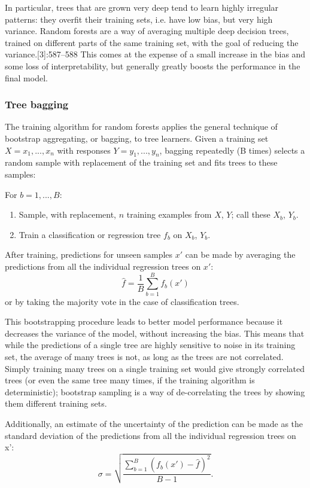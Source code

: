 \documentclass[document.tex]{subfiles}
\begin{document}
In particular, trees that are grown very deep tend to learn highly irregular patterns: they overfit their training sets, i.e. have low bias, but very high variance. Random forests are a way of averaging multiple deep decision trees, trained on different parts of the same training set, with the goal of reducing the variance.[3]:587–588 This comes at the expense of a small increase in the bias and some loss of interpretability, but generally greatly boosts the performance in the final model.

\subsubsection{Tree bagging}
The training algorithm for random forests applies the general technique of bootstrap aggregating, or bagging, to tree learners. Given a training set $X = x_1, ..., x_n$ with responses $Y = y_1, ..., y_n$, bagging repeatedly (B times) selects a random sample with replacement of the training set and fits trees to these samples:

For $b = 1, ..., B:$
\begin{enumerate}
\item Sample, with replacement, $n$ training examples from $X$, $Y$; call these $X_b$, $Y_b$.
\item Train a classification or regression tree $f_b$ on $X_b$, $Y_b$.
\end{enumerate}

After training, predictions for unseen samples $x'$ can be made by averaging the predictions from all the individual regression trees on $x'$:
\begin{equation}
{\displaystyle {\hat {f}}={\frac {1}{B}}\sum _{b=1}^{B}f_{b}(x')} 
\end{equation}
or by taking the majority vote in the case of classification trees.

This bootstrapping procedure leads to better model performance because it decreases the variance of the model, without increasing the bias. This means that while the predictions of a single tree are highly sensitive to noise in its training set, the average of many trees is not, as long as the trees are not correlated. Simply training many trees on a single training set would give strongly correlated trees (or even the same tree many times, if the training algorithm is deterministic); bootstrap sampling is a way of de-correlating the trees by showing them different training sets.

Additionally, an estimate of the uncertainty of the prediction can be made as the standard deviation of the predictions from all the individual regression trees on x':
\begin{equation}
{\displaystyle \sigma ={\sqrt {\frac {\sum _{b=1}^{B}(f_{b}(x')-{\hat {f}})^{2}}{B-1}}}.}
\end{equation}
\end{document}
